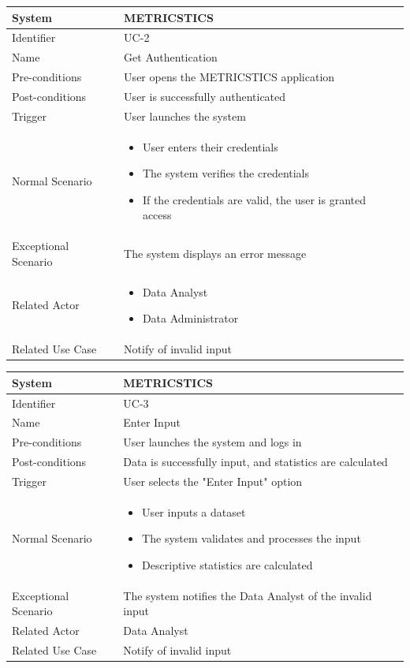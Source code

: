 \documentclass[letterpaper,12pt]{article}
\begin{document}
\begin{itemize}
\begin{tabular}{|p{1.45in}|p{3.65in}|}
    \hline
    System & METRICSTICS \\
    \hline
    Identifier & UC-2 \\
    \hline
    Name & Get Authentication \\
    \hline
    Pre-conditions & User opens the METRICSTICS application\\
   \hline
    Post-conditions & User is successfully authenticated \\
   \hline
    Trigger & User launches the system \\
    \hline
    Normal Scenario &  \begin{itemize}
   \item User enters their credentials
   \item The system verifies the credentials
   \item If the credentials are valid, the user is granted access
   \end{itemize}\\
    \hline
    Exceptional Scenario & The system displays an error message \\
    \hline
    Related Actor& \begin{itemize}
   \item Data Analyst
   \item Data Administrator
   \end{itemize}\\
    \hline
    Related Use Case & Notify of invalid input\\
\hline
\end{tabular}
\bigskip
\bigskip

\begin{tabular}{|p{1.45in}|p{3.65in}|}
    \hline
    System & METRICSTICS \\
    \hline
    Identifier & UC-3 \\
    \hline
    Name & Enter Input \\
    \hline
    Pre-conditions & User launches the system and logs in\\
   \hline
    Post-conditions & Data is successfully input, and statistics are calculated\\
   \hline
    Trigger & User selects the "Enter Input" option \\
    \hline
    Normal Scenario &  \begin{itemize}
   \item User inputs a dataset
   \item The system validates and processes the input
   \item Descriptive statistics are calculated
   \end{itemize}\\
    \hline
    Exceptional Scenario & The system notifies the Data Analyst of the invalid input \\
    \hline
    Related Actor& Data Analyst\\
    \hline
    Related Use Case & Notify of invalid input\\
\hline
\end{tabular}
\bigskip
\bigskip


\end{itemize}
\end{document}
